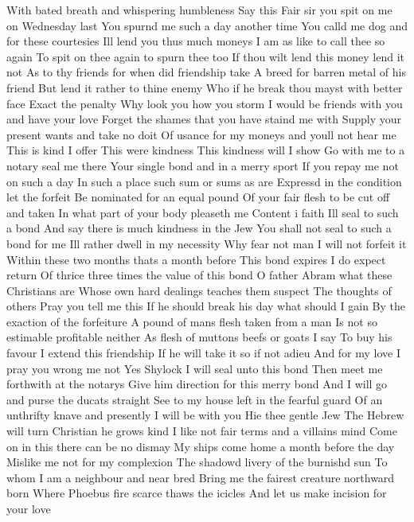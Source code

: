 With bated breath and whispering humbleness Say this 
Fair sir you spit on me on Wednesday last 
You spurnd me such a day another time 
You calld me dog and for these courtesies 
Ill lend you thus much moneys 
I am as like to call thee so again 
To spit on thee again to spurn thee too 
If thou wilt lend this money lend it not 
As to thy friends for when did friendship take 
A breed for barren metal of his friend 
But lend it rather to thine enemy 
Who if he break thou mayst with better face 
Exact the penalty 
Why look you how you storm 
I would be friends with you and have your love 
Forget the shames that you have staind me with 
Supply your present wants and take no doit 
Of usance for my moneys and youll not hear me 
This is kind I offer 
This were kindness 
This kindness will I show 
Go with me to a notary seal me there 
Your single bond and in a merry sport 
If you repay me not on such a day 
In such a place such sum or sums as are 
Expressd in the condition let the forfeit 
Be nominated for an equal pound 
Of your fair flesh to be cut off and taken 
In what part of your body pleaseth me 
Content i faith Ill seal to such a bond 
And say there is much kindness in the Jew 
You shall not seal to such a bond for me 
Ill rather dwell in my necessity 
Why fear not man I will not forfeit it 
Within these two months thats a month before 
This bond expires I do expect return 
Of thrice three times the value of this bond 
O father Abram what these Christians are 
Whose own hard dealings teaches them suspect 
The thoughts of others Pray you tell me this 
If he should break his day what should I gain 
By the exaction of the forfeiture 
A pound of mans flesh taken from a man 
Is not so estimable profitable neither 
As flesh of muttons beefs or goats I say 
To buy his favour I extend this friendship 
If he will take it so if not adieu 
And for my love I pray you wrong me not 
Yes Shylock I will seal unto this bond 
Then meet me forthwith at the notarys 
Give him direction for this merry bond 
And I will go and purse the ducats straight 
See to my house left in the fearful guard 
Of an unthrifty knave and presently 
I will be with you 
Hie thee gentle Jew 
The Hebrew will turn Christian he grows kind 
I like not fair terms and a villains mind 
Come on in this there can be no dismay 
My ships come home a month before the day 
Mislike me not for my complexion 
The shadowd livery of the burnishd sun 
To whom I am a neighbour and near bred 
Bring me the fairest creature northward born 
Where Phoebus fire scarce thaws the icicles 
And let us make incision for your love 
